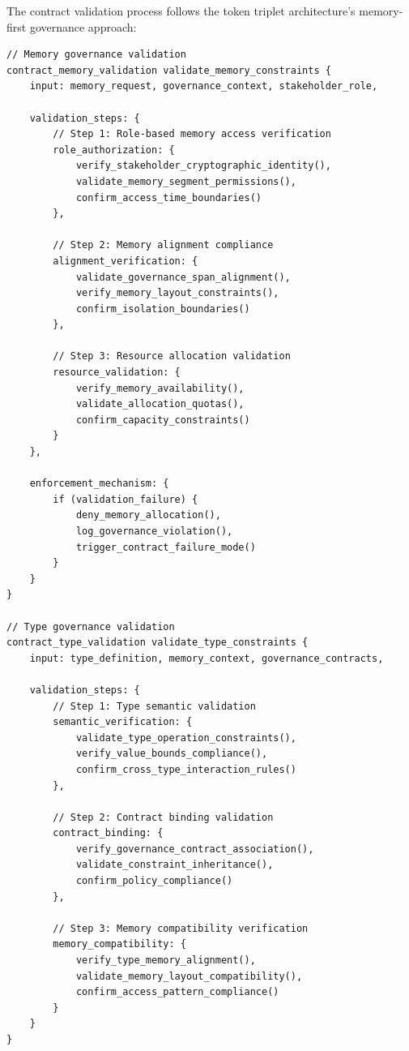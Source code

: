 \documentclass[11pt,letterpaper]{article}
\begin{document}
The contract validation process follows the token triplet architecture's memory-first governance approach:

\begin{lstlisting}[language=rift, caption=Contract Validation Chain Implementation]
// Memory governance validation
contract_memory_validation validate_memory_constraints {
    input: memory_request, governance_context, stakeholder_role,
    
    validation_steps: {
        // Step 1: Role-based memory access verification
        role_authorization: {
            verify_stakeholder_cryptographic_identity(),
            validate_memory_segment_permissions(),
            confirm_access_time_boundaries()
        },
        
        // Step 2: Memory alignment compliance
        alignment_verification: {
            validate_governance_span_alignment(),
            verify_memory_layout_constraints(),
            confirm_isolation_boundaries()
        },
        
        // Step 3: Resource allocation validation
        resource_validation: {
            verify_memory_availability(),
            validate_allocation_quotas(),
            confirm_capacity_constraints()
        }
    },
    
    enforcement_mechanism: {
        if (validation_failure) {
            deny_memory_allocation(),
            log_governance_violation(),
            trigger_contract_failure_mode()
        }
    }
}

// Type governance validation  
contract_type_validation validate_type_constraints {
    input: type_definition, memory_context, governance_contracts,
    
    validation_steps: {
        // Step 1: Type semantic validation
        semantic_verification: {
            validate_type_operation_constraints(),
            verify_value_bounds_compliance(),
            confirm_cross_type_interaction_rules()
        },
        
        // Step 2: Contract binding validation
        contract_binding: {
            verify_governance_contract_association(),
            validate_constraint_inheritance(),
            confirm_policy_compliance()
        },
        
        // Step 3: Memory compatibility verification
        memory_compatibility: {
            verify_type_memory_alignment(),
            validate_memory_layout_compatibility(),
            confirm_access_pattern_compliance()
        }
    }
}


\end{lstlisting}
\end{document}
